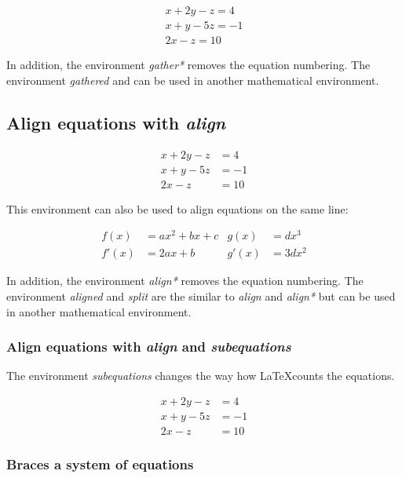 \documentclass{article}
\begin{document}
\begin{gather}
	x + 2y - z = 4 \\
	x + y - 5z = -1 \\
	2x - z = 10
\end{gather}

In addition, the environment \emph{gather*} removes the equation numbering. The environment \emph{gathered} and can be used in another mathematical environment.


\subsection*{Align equations with \emph{align}}

\begin{align}
	x + 2y - z &= 4 \\
	x + y - 5z &= -1 \\
	2x - z &= 10
\end{align}

This environment can also be used to align equations on the same line:

\begin{align*}
	f(x)  &= a x^2+b x +c   &   g(x)  &= d x^3 \\
	f'(x) &= 2 a x +b       &   g'(x) &= 3 d x^2
\end{align*}

In addition, the environment \emph{align*} removes the equation numbering. The environment \emph{aligned} and \emph{split} are the similar to \emph{align} and \emph{align*} but can be used in another mathematical environment.

\subsubsection*{Align equations with \emph{align} and \emph{subequations}}

The environment \emph{subequations} changes the way how \LaTeX counts the equations.

\begin{subequations}
	\begin{align}
		x + 2y - z &= 4 \\
		x + y - 5z &= -1 \\
		2x - z &= 10
	\end{align}
\end{subequations}

\subsubsection*{Braces a system of equations}
\end{document}
